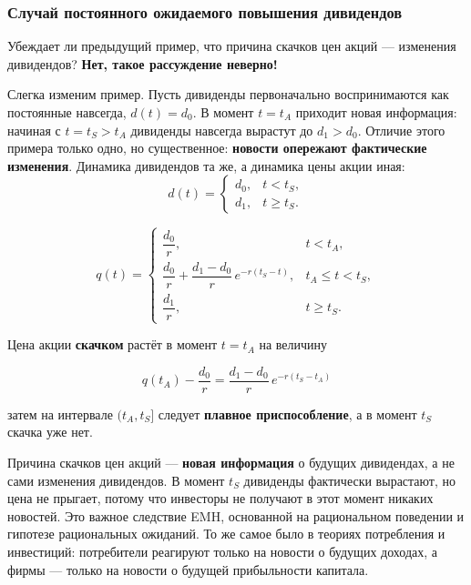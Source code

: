 \documentclass[10pt,a4paper]{article}
\begin{document}
\subsubsection{Случай постоянного ожидаемого повышения дивидендов}

Убеждает ли предыдущий пример, что причина скачков цен акций — изменения дивидендов? \textbf{Нет, такое рассуждение неверно!}

Слегка изменим пример. Пусть дивиденды первоначально воспринимаются как постоянные навсегда, $d(t)=d_0$. В момент $t=t_A$ приходит новая информация: начиная с $t=t_S>t_A$ дивиденды навсегда вырастут до $d_1>d_0$. Отличие этого примера только одно, но существенное: \textbf{новости опережают фактические изменения}. Динамика дивидендов та же, а динамика цены акции иная:
$$d(t)=\begin{cases} d_0, & t<t_S,\\ d_1, & t\ge t_S.\end{cases}$$
\begin{formulabox}
\begin{equation}
q(t)=\begin{cases}
\dfrac{d_0}{r}, & t<t_A,\\[2mm]
\dfrac{d_0}{r}+\dfrac{d_1-d_0}{r}\,e^{-r(t_S-t)}, & t_A\le t<t_S,\\[2mm]
\dfrac{d_1}{r}, & t\ge t_S.
\end{cases} \tag{10.13}
\end{equation}
\end{formulabox}
Цена акции \textbf{скачком} растёт в момент $t=t_A$ на величину
\begin{formulabox}
\begin{equation}
q(t_A)-\frac{d_0}{r} = \frac{d_1-d_0}{r}\,e^{-r(t_S-t_A)} \tag{10.14$'$}
\end{equation}
\end{formulabox}
затем на интервале $(t_A,t_S]$ следует \textbf{плавное приспособление}, а в момент $t_S$ скачка уже нет.

\begin{intuition}
Причина скачков цен акций — \textbf{новая информация} о будущих дивидендах, а не сами изменения дивидендов. В момент $t_S$ дивиденды фактически вырастают, но цена не прыгает, потому что инвесторы не получают в этот момент никаких новостей. Это важное следствие EMH, основанной на рациональном поведении и гипотезе рациональных ожиданий. То же самое было в теориях потребления и инвестиций: потребители реагируют только на новости о будущих доходах, а фирмы — только на новости о будущей прибыльности капитала.
\end{intuition}
\end{document}
